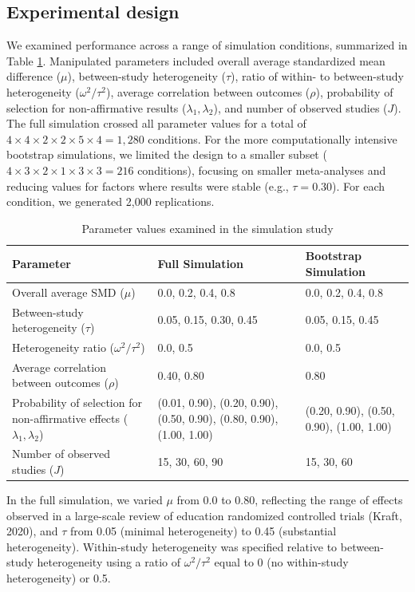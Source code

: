\documentclass[
  american,
  man, donotrepeattitle,floatsintext]{apa7}
\begin{document}
\subsection{Experimental design}\label{experimental-design}

We examined performance across a range of simulation conditions, summarized in Table \ref{tab:sim-design}. Manipulated parameters included overall average standardized mean difference (\(\mu\)), between-study heterogeneity (\(\tau\)), ratio of within- to between-study heterogeneity (\(\omega^2 / \tau^2\)), average correlation between outcomes (\(\rho\)), probability of selection for non-affirmative results (\(\lambda_1, \lambda_2\)), and number of observed studies (\(J\)). The full simulation crossed all parameter values for a total of \(4 \times 4 \times 2 \times 2 \times 5 \times 4 = 1,280\) conditions. For the more computationally intensive bootstrap simulations, we limited the design to a smaller subset (\(4 \times 3 \times 2 \times 1 \times 3 \times 3 = 216\) conditions), focusing on smaller meta-analyses and reducing values for factors where results were stable (e.g., \(\tau = 0.30\)). For each condition, we generated 2,000 replications.

\begin{table}
\centering
\caption{\label{tab:sim-design}Parameter values examined in the simulation study}
\centering
\begin{tabular}[t]{>{\raggedright\arraybackslash}p{2.5in}ll}
\toprule
Parameter & Full Simulation & Bootstrap Simulation\\
\midrule
Overall average SMD ($\mu$) & 0.0, 0.2, 0.4, 0.8 & 0.0, 0.2, 0.4, 0.8\\
Between-study heterogeneity ($\tau$) & 0.05, 0.15, 0.30, 0.45 & 0.05, 0.15, 0.45\\
Heterogeneity ratio ($\omega^2 / \tau^2$) & 0.0, 0.5 & 0.0, 0.5\\
Average correlation between outcomes ($\rho$) & 0.40, 0.80 & 0.80\\
Probability of selection for non-affirmative effects ($\lambda_1, \lambda_2$) & (0.01, 0.90), (0.20, 0.90), (0.50, 0.90), (0.80, 0.90), (1.00, 1.00) & (0.20, 0.90), (0.50, 0.90), (1.00, 1.00)\\
\addlinespace
Number of observed studies ($J$) & 15, 30, 60, 90 & 15, 30, 60\\
\bottomrule
\end{tabular}
\end{table}

In the full simulation, we varied \(\mu\) from 0.0 to 0.80, reflecting the range of effects observed in a large-scale review of education randomized controlled trials (Kraft, 2020), and \(\tau\) from 0.05 (minimal heterogeneity) to 0.45 (substantial heterogeneity). Within-study heterogeneity was specified relative to between-study heterogeneity using a ratio of \(\omega^2 / \tau^2\) equal to 0 (no within-study heterogeneity) or 0.5.
\end{document}
